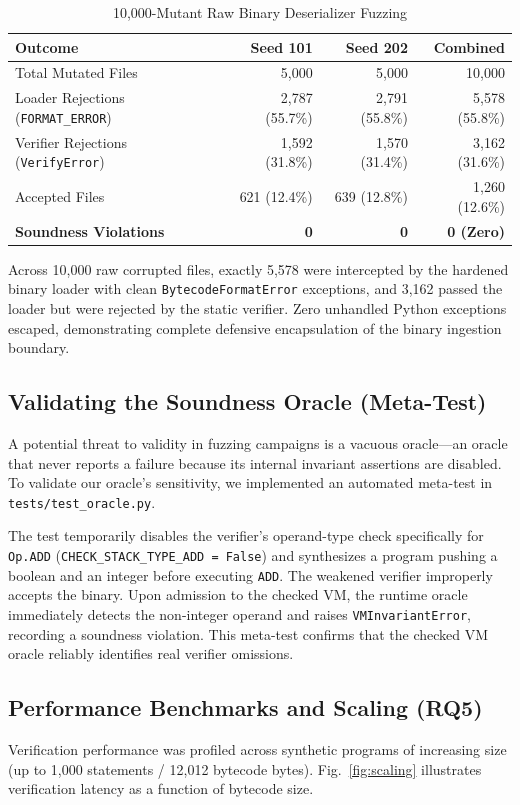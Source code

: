 \documentclass[conference]{IEEEtran}
\begin{document}
\begin{table}[htbp]
\caption{10,000-Mutant Raw Binary Deserializer Fuzzing}
\label{tab:file_fuzz}
\centering
\begin{tabular}{lrrr}
\toprule
\textbf{Outcome} & \textbf{Seed 101} & \textbf{Seed 202} & \textbf{Combined} \\
\midrule
Total Mutated Files & 5,000 & 5,000 & 10,000 \\
Loader Rejections (\texttt{FORMAT\_ERROR}) & 2,787 (55.7\%) & 2,791 (55.8\%) & 5,578 (55.8\%) \\
Verifier Rejections (\texttt{VerifyError}) & 1,592 (31.8\%) & 1,570 (31.4\%) & 3,162 (31.6\%) \\
Accepted Files & 621 (12.4\%) & 639 (12.8\%) & 1,260 (12.6\%) \\
\textbf{Soundness Violations} & \textbf{0} & \textbf{0} & \textbf{0 (Zero)} \\
\bottomrule
\end{tabular}
\end{table}

Across 10,000 raw corrupted files, exactly 5,578 were intercepted by the hardened binary loader with clean \texttt{BytecodeFormatError} exceptions, and 3,162 passed the loader but were rejected by the static verifier. Zero unhandled Python exceptions escaped, demonstrating complete defensive encapsulation of the binary ingestion boundary.

\subsection{Validating the Soundness Oracle (Meta-Test)}
A potential threat to validity in fuzzing campaigns is a vacuous oracle—an oracle that never reports a failure because its internal invariant assertions are disabled. To validate our oracle's sensitivity, we implemented an automated meta-test in \texttt{tests/test_oracle.py}.

The test temporarily disables the verifier's operand-type check specifically for \texttt{Op.ADD} (\texttt{CHECK\_STACK\_TYPE\_ADD = False}) and synthesizes a program pushing a boolean and an integer before executing \texttt{ADD}. The weakened verifier improperly accepts the binary. Upon admission to the checked VM, the runtime oracle immediately detects the non-integer operand and raises \texttt{VMInvariantError}, recording a soundness violation. This meta-test confirms that the checked VM oracle reliably identifies real verifier omissions.

\subsection{Performance Benchmarks and Scaling (RQ5)}
Verification performance was profiled across synthetic programs of increasing size (up to 1,000 statements / 12,012 bytecode bytes). Fig.~\ref{fig:scaling} illustrates verification latency as a function of bytecode size.
\end{document}
